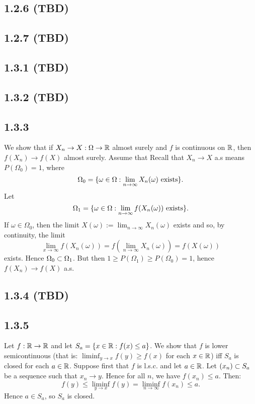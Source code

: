 \documentclass[11pt]{article}
\begin{document}
\subsection*{1.2.6 (TBD)}

\subsection*{1.2.7 (TBD)}

\subsection*{1.3.1 (TBD)}

\subsection*{1.3.2 (TBD)}

\subsection*{1.3.3}

We show that if $X_n \to X : \Omega \to {\mathbb R}$ almost surely and $f$ is continuous on ${\mathbb R}$, then $f(X_n) \to f(X)$ almost surely. Assume that Recall that $X_n \to X$ a.s means $P(\Omega_0) = 1$, where \[\Omega_0 = \{\omega \in \Omega: \lim_{n\to \infty} X_n(\omega) \text{ exists}\}.\] Let \[\Omega_1 =  \{\omega \in \Omega: \lim_{n\to \infty} f(X_n(\omega)) \text{ exists}\}.\] If $\omega \in \Omega_0$, then the limit $X(\omega) := \lim_{n\to \infty} X_n(\omega)$ exists and so, by continuity, the limit \[\lim_{x\to \infty } f(X_n(\omega)) = f(\lim_{n\to \infty} X_n(\omega)) = f(X(\omega))\] exists. Hence $\Omega_0 \subset \Omega_1$. But then $1 \geq P(\Omega_1) \geq P(\Omega_0) = 1$, hence $f(X_n) \to f(X)$ a.s.

\subsection*{1.3.4 (TBD)}

\subsection*{1.3.5}

Let $f:{\mathbb R} \to {\mathbb R}$ and let $S_a = \{x \in {\mathbb R} : f(x) \leq a\}$. We show that $f$ is lower semicontinuous (that is: $\liminf_{y\to x}f(y) \geq f(x)$ for each $x \in {\mathbb R}$) iff $S_a$ is closed for each $a \in {\mathbb R}$. Suppose first that $f$ is l.s.c. and let $a \in {\mathbb R}$. Let $(x_n) \subset S_a$ be a sequence such that $x_n \to y$. Hence for all $n$, we have $f(x_n) \leq a$. Then: \[f(y) \leq \liminf_{y \to x} f(y) = \liminf_{n \to \infty} f(x_n) \leq a.\] Hence $a \in S_a$, so $S_a$ is closed. 
\end{document}
